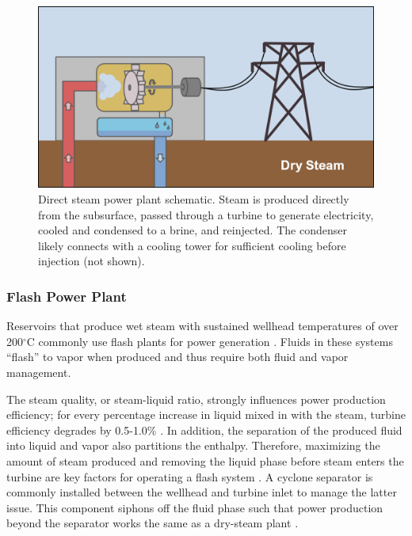 \begin{figure}[H] %
\centering
\includegraphics[width=.9\textwidth]{templates/images/Figure-SteamPlant_Schematic.png}
\caption[Direct steam power plant schematic]{Direct steam power plant schematic. Steam is produced directly from the subsurface, passed through a turbine to generate electricity, cooled and condensed to a brine, and reinjected. The condenser likely connects with a cooling tower for sufficient cooling before injection (not shown).}
\label{fig:steam_plant}
\end{figure}

\subsubsection{Flash Power Plant}\label{ch2:flash_plant}
Reservoirs that produce wet steam with sustained wellhead temperatures of over 200$^\circ$C commonly use flash plants for power generation \citep{moore_more_2013}. Fluids in these systems “flash” to vapor when produced and thus require both fluid and vapor management. 

The steam quality, or steam-liquid ratio, strongly influences power production efficiency; for every percentage increase in liquid mixed in with the steam, turbine efficiency degrades by 0.5-1.0\% \citep[Baumann Rule,][p.\ 207]{glassley_geothermal_2015}. In addition, the separation of the produced fluid into liquid and vapor also partitions the enthalpy. Therefore, maximizing the amount of steam produced and removing the liquid phase before steam enters the turbine are key factors for operating a flash system \citep[p.\ 215-216]{glassley_geothermal_2015}. A cyclone separator is commonly installed between the wellhead and turbine inlet to manage the latter issue. This component siphons off the fluid phase such that power production beyond the separator works the same as a dry-steam plant \citep[p.\ 88]{dipippo_geothermal_2012}.


